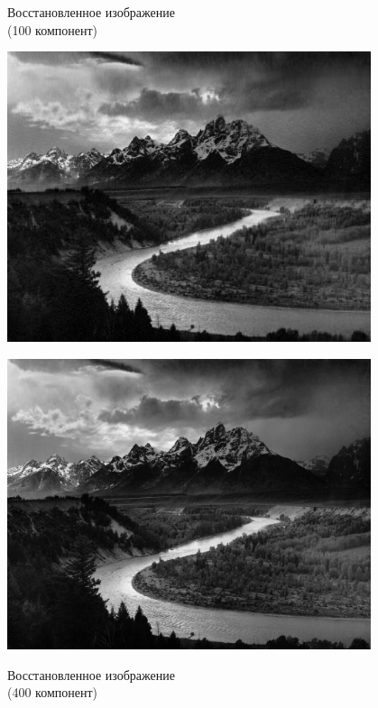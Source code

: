 \documentclass[a4paper]{article}
\begin{document}
\begin{figure}[H]
    \begin{minipage}{.5\textwidth}
      \centering
    \caption{Восстановленное изображение \\(100 компонент)}
    \includegraphics[width = 0.95\textwidth]{reconstructions/with_100comps_Adams_The_Tetons_and_the_Snake_River.jpg}
    \label{fig:mount_100}
    \hspace{8 mm}
    \caption{Восстановленное изображение \\(400 компонент)}
    \includegraphics[width = 0.95\textwidth]{reconstructions/with_400comps_Adams_The_Tetons_and_the_Snake_River.jpg}
    \label{fig:mount_400}
    \end{minipage}%
\end{figure}
\end{document}
